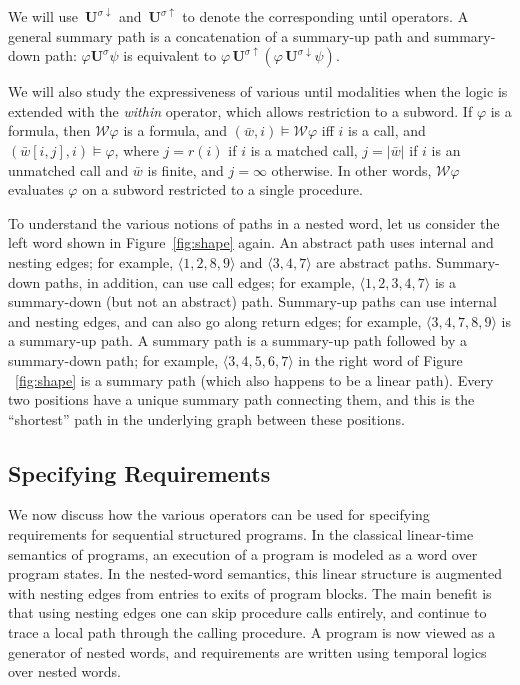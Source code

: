 \documentclass{LMCS}
\newcommand{\w}{{\bar{w}}}
\newcommand{\WW}{{\mathcal{W}}}
\newcommand{\U}{{\mathbf U}}
\renewcommand{\phi}{\varphi}
\theoremstyle{plain}
\theoremstyle{definition}
\newcommand{\ppath}{\sigma} \newcommand{\Ul}{\U}
\newcommand{\Up}{\U^\ppath}
\newcommand{\puntil}{\Up}
\newcommand{\dpuntil}{{\,\U^{\ppath\downarrow}}}
\newcommand{\upuntil}{{\,\U^{\ppath\uparrow}}}
\newcounter{example}
\begin{document}
We will use $\dpuntil$ and $\upuntil$ to denote the
corresponding until operators.  A general summary path is a concatenation of a summary-up path and
summary-down path: $\phi\puntil\psi$ is equivalent to
$\phi\upuntil(\phi\dpuntil\psi)$. 


We will also study the expressiveness of various until modalities when
the logic is extended with the {\em within\/} operator, which allows
restriction to a subword.  If $\phi$ is a formula, then $\WW\phi$ is a
formula, and $(\w,i)\models\WW\phi$ iff $i$ is a call, and
$(\w[i,j],i)\models\phi$, where $j=r(i)$ if $i$ is a matched call,
$j=|\w|$ if $i$ is an unmatched call and $\w$ is finite, and $j =
\infty$ otherwise.  In other words, $\WW\phi$ evaluates $\phi$ on a
subword restricted to a single procedure.



To understand the various notions of paths in a nested word, let us
consider the left word shown in Figure~\ref{fig:shape} again.  An
abstract path uses internal and nesting edges; for
example, $\langle 1,2,8,9\rangle$ and $\langle 3,4,7\rangle$ are
abstract paths.  Summary-down paths, in addition, can use call edges;
for example, $\langle 1,2,3,4,7\rangle$ is a summary-down
(but not an abstract) path.  Summary-up paths 
can use internal and nesting edges, and can also go 
along return edges; for example, $\langle 3,4,7,8,9\rangle$ is a
summary-up path.  A summary path is a summary-up path followed by a
summary-down path; for example, $\langle 3,4,5,6,7\rangle$ 
in the right word of Figure ~\ref{fig:shape} is a
summary path (which also happens to be a linear path).  
Every two positions have a unique
summary path connecting them, and this is the ``shortest'' path in the
underlying graph between these positions.

\subsection{Specifying Requirements}
We now discuss how the various operators can be used for
specifying requirements for sequential structured programs.
In the classical linear-time semantics of programs,
an execution of a program is modeled as a word over program states.
In the nested-word semantics, this linear structure 
is augmented with nesting edges from
entries to exits of program blocks.
The main benefit is that using nesting edges one can 
skip procedure calls entirely, and continue to
trace a local path through the calling procedure.
A program is now viewed as a generator of nested words,
and requirements are written using temporal logics over nested words.
\end{document}
